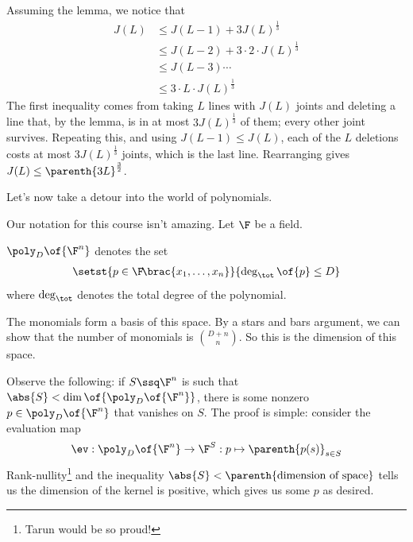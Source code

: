 Assuming the lemma, we notice that
\begin{align*}
    J(L)
    &\leq J(L - 1) + 3J(L)^{\frac{1}{3}} \\
    &\leq J(L - 2) + 3 \cdot 2 \cdot J(L)^{\frac{1}{3}} \\
    &\leq J(L - 3) \cdots \\
    &\leq 3 \cdot L \cdot J(L)^{\frac{1}{3}}
\end{align*}
The first inequality comes from taking $L$ lines with $J(L)$ joints and deleting a line that, by the lemma, is in at most $3J(L)^{\frac{1}{3}}$ of them; every other joint survives. Repeating this, and using $J(L - 1) \leq J(L)$, each of the $L$ deletions costs at most $3J(L)^{\frac{1}{3}}$ joints, which is the last line. Rearranging gives $J(L) \leq \parenth{3L}^{\frac{3}{2}}$.

Let's now take a detour into the world of polynomials.

Our notation for this course isn't amazing. Let $\F$ be a field.

\begin{boxnotation}
    $\poly_D\of{\F^n}$ denotes the set
    \begin{align*}
        \setst{p \in \F\!\brac{x_1, \ldots, x_n}}{\deg_{\tot}\of{p} \leq D}
    \end{align*}
    where $\deg_{\tot}$ denotes the total degree of the polynomial.
\end{boxnotation}

The monomials form a basis of this space. By a stars and bars argument, we can show that the number of monomials is $\binom{D + n}{n}$. So this is the dimension of this space.

Observe the following: if $S \ssq \F^n$ is such that $\abs{S} < \dim\of{\poly_D\of{\F^n}}$, there is some nonzero $p \in \poly_D\of{\F^n}$ that vanishes on $S$. The proof is simple: consider the evaluation map
\begin{align*}
    \ev : \poly_D\of{\F^n} \to \F^{S} : p \mapsto \parenth{p(s)}_{s \in S}
\end{align*}
Rank-nullity\footnote{Tarun would be so proud!} and the inequality $\abs{S} < \parenth{\text{dimension of space}}$ tells us the dimension of the kernel is positive, which gives us some $p$ as desired.
